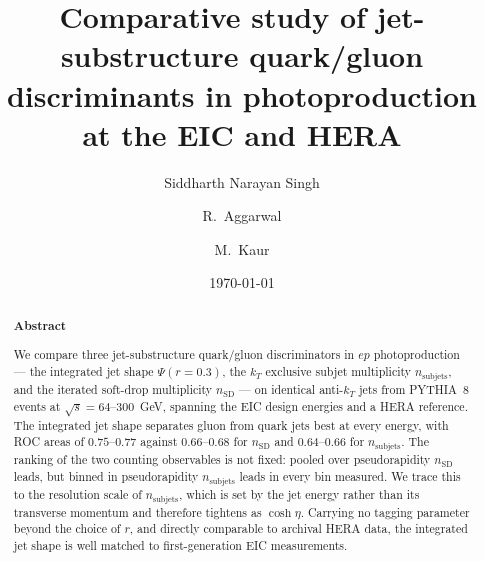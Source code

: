 \documentclass[reprint,amsmath,amssymb,aps,prd,floatfix]{revtex4-2}
\begin{document}

\title{Comparative study of jet-substructure quark/gluon discriminants in photoproduction at the EIC and HERA}

\author{Siddharth Narayan Singh}

\author{R.~Aggarwal}

\author{M.~Kaur}

\date{\today}

\begin{abstract}
\centering \textbf{Abstract}
\begin{justify}
We compare three jet-substructure quark/gluon discriminators in $ep$ photoproduction --- the integrated jet shape $\Psi(r=0.3)$, the $k_T$ exclusive subjet multiplicity $n_{\mathrm{subjets}}$, and the iterated soft-drop multiplicity $n_{\mathrm{SD}}$ --- on identical anti-$k_T$ jets from PYTHIA~8 events at $\sqrt{s} = 64$--$300$~GeV, spanning the EIC design energies and a HERA reference. The integrated jet shape separates gluon from quark jets best at every energy, with ROC areas of $0.75$--$0.77$ against $0.66$--$0.68$ for $n_{\mathrm{SD}}$ and $0.64$--$0.66$ for $n_{\mathrm{subjets}}$. The ranking of the two counting observables is not fixed: pooled over pseudorapidity $n_{\mathrm{SD}}$ leads, but binned in pseudorapidity $n_{\mathrm{subjets}}$ leads in every bin measured. We trace this to the resolution scale of $n_{\mathrm{subjets}}$, which is set by the jet energy rather than its transverse momentum and therefore tightens as $\cosh\eta$. Carrying no tagging parameter beyond the choice of $r$, and directly comparable to archival HERA data, the integrated jet shape is well matched to first-generation EIC measurements.
\end{justify}
\end{abstract}

\maketitle

\end{document}
